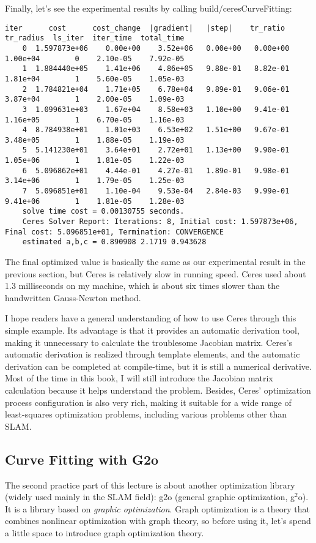 Finally, let's see the experimental results by calling build/ceresCurveFitting: 
\begin{lstlisting}[caption=erminal output: ]
    iter      cost      cost_change  |gradient|   |step|    tr_ratio  tr_radius  ls_iter  iter_time  total_time
    0  1.597873e+06    0.00e+00    3.52e+06   0.00e+00   0.00e+00  1.00e+04        0    2.10e-05    7.92e-05
    1  1.884440e+05    1.41e+06    4.86e+05   9.88e-01   8.82e-01  1.81e+04        1    5.60e-05    1.05e-03
    2  1.784821e+04    1.71e+05    6.78e+04   9.89e-01   9.06e-01  3.87e+04        1    2.00e-05    1.09e-03
    3  1.099631e+03    1.67e+04    8.58e+03   1.10e+00   9.41e-01  1.16e+05        1    6.70e-05    1.16e-03
    4  8.784938e+01    1.01e+03    6.53e+02   1.51e+00   9.67e-01  3.48e+05        1    1.88e-05    1.19e-03
    5  5.141230e+01    3.64e+01    2.72e+01   1.13e+00   9.90e-01  1.05e+06        1    1.81e-05    1.22e-03
    6  5.096862e+01    4.44e-01    4.27e-01   1.89e-01   9.98e-01  3.14e+06        1    1.79e-05    1.25e-03
    7  5.096851e+01    1.10e-04    9.53e-04   2.84e-03   9.99e-01  9.41e+06        1    1.81e-05    1.28e-03
    solve time cost = 0.00130755 seconds. 
    Ceres Solver Report: Iterations: 8, Initial cost: 1.597873e+06, Final cost: 5.096851e+01, Termination: CONVERGENCE
    estimated a,b,c = 0.890908 2.1719 0.943628 
\end{lstlisting}

The final optimized value is basically the same as our experimental result in the previous section, but Ceres is relatively slow in running speed. Ceres used about 1.3 milliseconds on my machine, which is about six times slower than the handwritten Gauss-Newton method.

I hope readers have a general understanding of how to use Ceres through this simple example. Its advantage is that it provides an automatic derivation tool, making it unnecessary to calculate the troublesome Jacobian matrix. Ceres's automatic derivation is realized through template elements, and the automatic derivation can be completed at compile-time, but it is still a numerical derivative. Most of the time in this book, I will still introduce the Jacobian matrix calculation because it helps understand the problem. Besides, Ceres' optimization process configuration is also very rich, making it suitable for a wide range of least-squares optimization problems, including various problems other than SLAM.

\subsection{Curve Fitting with G2o}
The second practice part of this lecture is about another optimization library (widely used mainly in the SLAM field): g2o (general graphic optimization, g$^2$o). It is a library based on \textit{graphic optimization}. Graph optimization is a theory that combines nonlinear optimization with graph theory, so before using it, let's spend a little space to introduce graph optimization theory.

